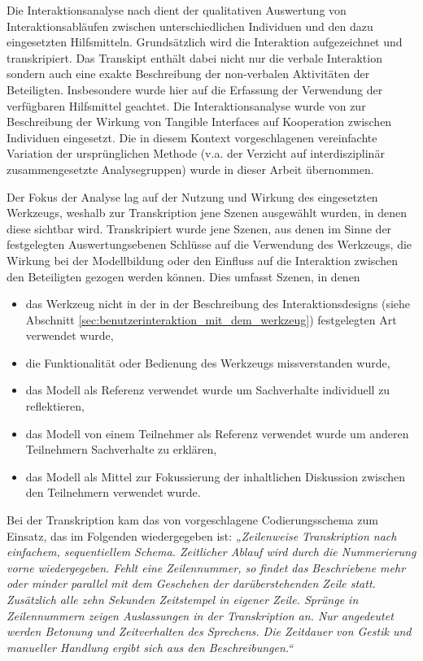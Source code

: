 Die Interaktionsanalyse nach \citet{Jordan95} dient der qualitativen Auswertung von Interaktionsabläufen zwischen unterschiedlichen Individuen und den dazu eingesetzten Hilfsmitteln. Grundsätzlich wird die Interaktion aufgezeichnet und transkripiert. Das Transkipt enthält dabei nicht nur die verbale Interaktion sondern auch eine exakte Beschreibung der non-verbalen Aktivitäten der Beteiligten. Insbesondere wurde hier auf die Erfassung der Verwendung der verfügbaren Hilfsmittel geachtet. Die Interaktionsanalyse wurde von \citet{Hornecker04} zur Beschreibung der Wirkung von Tangible Interfaces auf Kooperation zwischen Individuen eingesetzt. Die in diesem Kontext vorgeschlagenen vereinfachte Variation der ursprünglichen Methode (v.a. der Verzicht auf interdisziplinär zusammengesetzte Analysegruppen) wurde in dieser Arbeit übernommen. 

Der Fokus der Analyse lag auf der Nutzung und Wirkung des eingesetzten Werkzeugs, weshalb zur Transkription jene Szenen ausgewählt wurden, in denen diese sichtbar wird. Transkripiert wurde jene Szenen, aus denen im Sinne der festgelegten Auswertungsebenen Schlüsse auf die Verwendung des Werkzeugs, die Wirkung bei der Modellbildung oder den Einfluss auf die Interaktion zwischen den Beteiligten gezogen werden können. Dies umfasst Szenen, in denen
\begin{itemize}
  \item das Werkzeug nicht in der in der Beschreibung des Interaktionsdesigns (siehe Abschnitt \ref{sec:benutzerinteraktion_mit_dem_werkzeug}) festgelegten Art verwendet wurde,
  \item die Funktionalität oder Bedienung des Werkzeugs missverstanden wurde,
  \item das Modell als Referenz verwendet wurde um Sachverhalte individuell zu reflektieren,
  \item das Modell von einem Teilnehmer als Referenz verwendet wurde um anderen Teilnehmern Sachverhalte zu erklären,
  \item das Modell als Mittel zur Fokussierung der inhaltlichen Diskussion zwischen den Teilnehmern verwendet wurde.
\end{itemize}

Bei der Transkription kam das von \citet{Hornecker04} vorgeschlagene Codierungsschema zum Einsatz, das im Folgenden wiedergegeben ist: \emph{„Zeilenweise Transkription nach einfachem, sequentiellem Schema. Zeitlicher Ablauf wird durch die Nummerierung vorne wiedergegeben. Fehlt eine Zeilennummer, so findet das Beschriebene mehr oder minder parallel mit dem Geschehen der darüberstehenden Zeile statt. Zusätzlich alle zehn Sekunden Zeitstempel in eigener Zeile. Sprünge in Zeilennummern zeigen Auslassungen in der Transkription an. Nur angedeutet werden Betonung und Zeitverhalten des Sprechens. Die Zeitdauer von Gestik und manueller Handlung ergibt sich aus den Beschreibungen.“} 

